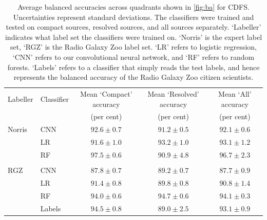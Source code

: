 \documentclass[fleqn,usenatbib,usedcolumn]{mnras}
\begin{document}
\begin{table}
  \caption{Average balanced accuracies across quadrants shown in
    \autoref{fig:ba} for CDFS. Uncertainties represent standard
    deviations. The classifiers were trained and tested on compact
    sources, resolved sources, and all sources separately. `Labeller'
    indicates what label set the classifiers were trained on. `Norris' is
    the expert label set, `RGZ' is the Radio Galaxy Zoo label set.%
    `LR' refers to logistic regression, `CNN' refers to our convolutional
    neural network, and `RF' refers to random forests. `Labels' refers to a
    classifier that simply reads the test labels, and hence represents the
    balanced accuracy of the Radio Galaxy Zoo citizen scientists.}
  \label{tab:average-accuracies}
  \begin{tabular}{llccc}
    \hline
    Labeller & Classifier & Mean `Compact' accuracy & Mean `Resolved' accuracy & Mean `All' accuracy\\
     & & (per cent) & (per cent) & (per cent)\\
    \hline
    Norris & CNN & $92.6 \pm 0.7$ & $91.2 \pm 0.5$ & $92.1 \pm 0.6$\\
     & LR & $91.6 \pm 1.0$ & $93.2 \pm 1.0$ & $93.1 \pm 1.2$\\
     & RF & $97.5 \pm 0.6$ & $90.9 \pm 4.8$ & $96.7 \pm 2.3$\\
     \\
    RGZ & CNN & $87.8 \pm 0.7$ & $89.2 \pm 0.7$ & $87.7 \pm 0.9$\\
     & LR & $91.4 \pm 0.8$ & $89.8 \pm 0.8$ & $90.8 \pm 1.4$\\
     & RF & $94.0 \pm 0.6$ & $94.7 \pm 0.6$ & $94.1 \pm 0.3$\\
     & Labels & $94.5 \pm 0.8$ & $89.0 \pm 2.5$ & $93.1 \pm 0.9$\\
    \hline
  \end{tabular}
\end{table}
\end{document}
